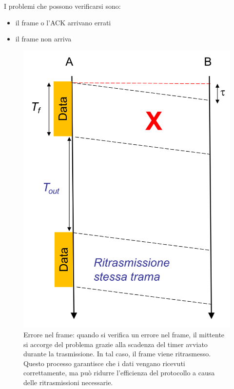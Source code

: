 I problemi che possono verificarsi sono:
\begin{multicols}{2}
\begin{itemize}
    \item il frame o l'ACK arrivano errati
    \item il frame non arriva
\end{itemize}
\end{multicols}

\begin{figure}[htbp]
    \centering
    \begin{minipage}{0.48\textwidth}
        \includegraphics[width=\linewidth]{images/erroreframe.png}
        \caption{Errore nel frame: quando si verifica un errore nel frame, il mittente si accorge del problema grazie alla scadenza del timer avviato durante la trasmissione. 
        In tal caso, il frame viene ritrasmesso. Questo processo garantisce che i dati vengano ricevuti correttamente, ma può ridurre l'efficienza del protocollo a causa delle ritrasmissioni necessarie.}

\end{minipage}
\end{figure}
